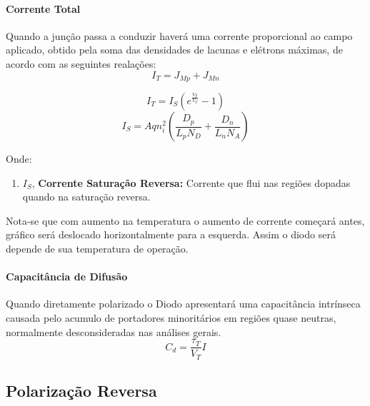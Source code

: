 \documentclass{article}
\begin{document}
            \paragraph{Corrente Total}Quando a junção passa a conduzir haverá uma corrente proporcional ao campo aplicado, obtido pela soma das densidades de lacunas e elétrons máximas, de acordo com as seguintes realações:
                \[
                    I_{T} = J_{Mp} + J_{Mn}
                \]
                \begin{multicols}{2}
                    \begin{equation}
                        \boxed{
                            I_{T} = I_{S} (e^{\frac{V_{F}}{V_{T}}} - 1)
                        }
                    \end{equation}
                    \begin{equation}
                        \boxed{
                            I_{S} = A q n_{i}^{2} \left(\frac{D_{p}}{L_{p}N_{D}} + \frac{D_{n}}{L_{n}N_{A}}\right)
                        }
                    \end{equation}
                \end{multicols}\noindent
            Onde:
                \begin{enumerate}[noitemsep]
                    \item $I_{S}$, \textbf{Corrente Saturação Reversa:} Corrente que flui nas regiões dopadas quando na saturação reversa.
                \end{enumerate}
            Nota-se que com aumento na temperatura o aumento de corrente começará antes, gráfico será deslocado horizontalmente para a esquerda. Assim o diodo será depende de sua temperatura de operação.

            \paragraph{Capacitância de Difusão}Quando diretamente polarizado o Diodo apresentará uma capacitância intrínseca causada pelo acumulo de portadores minoritários em regiões quase neutras, normalmente desconsideradas nas análises gerais.
                    \begin{equation}
                        \boxed{
                            C_{d} = \frac{\tau_{T}}{V_{T}}I
                        }
                    \end{equation}

        \subsection{Polarização Reversa}
\end{document}
